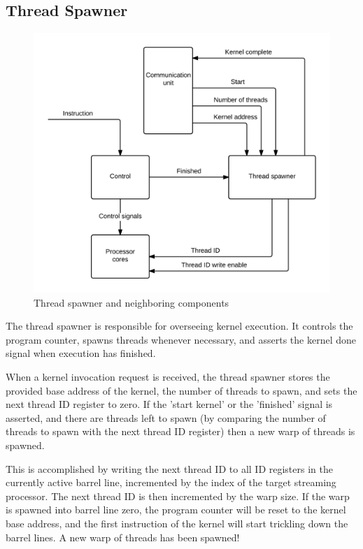 \subsection{Thread Spawner}

\begin{figure}[H]
	\centering
	\includegraphics[width=\textwidth]{../gpu/diagrams/thread_spawner.png}
	\caption{Thread spawner and neighboring components}
	\label{fig:thread_spawner}
\end{figure}

The thread spawner is responsible for overseeing kernel execution.
It controls the program counter, spawns threads whenever necessary, and asserts the kernel done signal when execution has finished.

When a kernel invocation request is received, the thread spawner stores the provided base address of the kernel, the number of threads to spawn, and sets the next thread ID register to zero.
If the 'start kernel' or the 'finished' signal is asserted, and there are threads left to spawn (by comparing the number of threads to spawn with the next thread ID register) then a new warp of threads is spawned.

This is accomplished by writing the next thread ID to all ID registers in the currently active barrel line, incremented by the index of the target streaming processor.
The next thread ID is then incremented by the warp size.
If the warp is spawned into barrel line zero, the program counter will be reset to the kernel base address, and the first instruction of the kernel will start trickling down the barrel lines.
A new warp of threads has been spawned!
